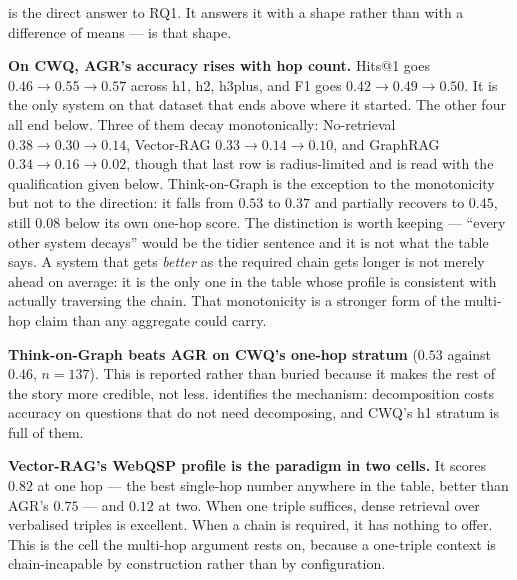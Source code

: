  is the direct answer to RQ1. It answers it with a shape
rather than with a difference of means ---  is that
shape.

\textbf{On CWQ, AGR's accuracy rises with hop count.} Hits@1 goes $0.46 \to 0.55
\to 0.57$ across \textsf{h1}, \textsf{h2}, \textsf{h3plus}, and F1 goes $0.42
\to 0.49 \to 0.50$. It is the only system on that dataset that ends above where
it started. The other four all end below. Three of them decay monotonically:
No-retrieval $0.38 \to 0.30 \to 0.14$, Vector-RAG $0.33 \to 0.14 \to 0.10$, and
GraphRAG $0.34 \to 0.16 \to 0.02$, though that last row is radius-limited and is
read with the qualification given below. Think-on-Graph is the exception to the
monotonicity but not to the direction: it falls from $0.53$ to $0.37$ and
partially recovers to $0.45$, still $0.08$ below its own one-hop score. The
distinction is worth keeping --- ``every other system decays'' would be the
tidier sentence and it is not what the table says. A system that gets
\emph{better} as the required chain gets longer is not merely ahead on average:
it is the only one in the table whose profile is consistent with actually
traversing the chain. That monotonicity is a stronger form of the multi-hop
claim than any aggregate could carry.

\textbf{Think-on-Graph beats AGR on CWQ's one-hop stratum} ($0.53$ against
$0.46$, $n = 137$). This is reported rather than buried because it makes the
rest of the story more credible, not less.  identifies the
mechanism: decomposition costs accuracy on questions that do not need
decomposing, and CWQ's \textsf{h1} stratum is full of them.

\textbf{Vector-RAG's WebQSP profile is the paradigm in two cells.} It scores
$0.82$ at one hop --- the best single-hop number anywhere in the table, better
than AGR's $0.75$ --- and $0.12$ at two. When one triple suffices, dense
retrieval over verbalised triples is excellent. When a chain is required, it has
nothing to offer. This is the cell the multi-hop argument rests on, because a
one-triple context is chain-incapable by construction rather than by
configuration.


